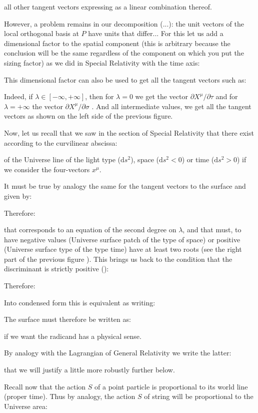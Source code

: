 	all other tangent vectors expressing as a linear combination thereof.
	
	However, a problem remains in our decomposition (...): the unit vectors of the local orthogonal basis at $P$ have units that differ... For this let us add a dimensional factor  to the spatial component (this is arbitrary because the conclusion will be the same regardless of the component on which you put the sizing factor) as we did in Special Relativity with the time axis:
	
	This dimensional factor can also be used to get all the tangent vectors such as:
	
	Indeed, if $\lambda\in [-\infty,+\infty]$, then for $\lambda=0$ we get the vector $\partial X^\mu/\partial \tau$ and for $\lambda=+\infty$ the vector $\partial X^\mu/\partial \sigma$ . And all intermediate values, we get all the tangent vectors as shown on the left side of the previous figure.

	Now, let us recall that we saw in the section of Special Relativity that there exist according to the curvilinear abscissa:
	
	of the Universe line of the light type ($\mathrm{d}s^2$), space ($\mathrm{d}s^2<0$) or time ($\mathrm{d}s^2>0$) if we consider the four-vectors $x^\mu$.

	It must be true by analogy the same for the tangent vectors to the surface and given by:
	
	Therefore:
	
	that corresponds to an equation of the second degree on $\lambda$, and that must, to have negative values (Universe surface patch of the type of space) or positive (Universe surface type of the type time) have at least two roots (see the right part of the previous figure ). This brings us back to the condition that the discriminant is strictly positive ():
	
	Therefore:
	
	Into condensed form this is equivalent as writing:
	
	The surface must therefore be written as:
	
	if we want the radicand has a physical sense.
	
	By analogy with the Lagrangian of General Relativity we write the latter:
	
	that we will justify a little more robustly further below.
	
	Recall now that the action $S$ of a point particle is proportional to its world line (proper time). Thus by analogy, the action $S$ of string will be proportional to the Universe area:
	
